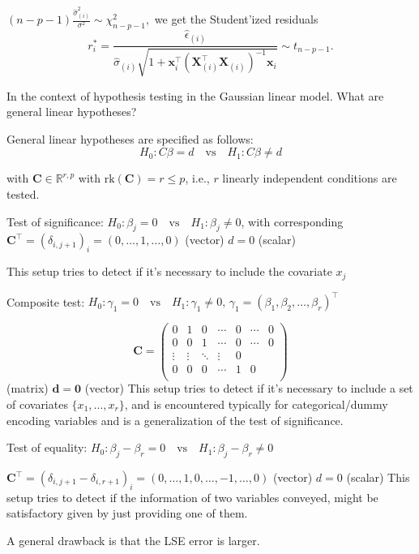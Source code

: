 \(
\left( n - p - 1 \right) \frac{\hat{\sigma}^2_{(i)}}{\sigma^2} \sim \chi^2_{n - p - 1},
\)
we get the Student'ized residuals
\[
r_i^* = \frac{\hat{\epsilon}_{(i)}}{\hat{\sigma}_{(i)} \sqrt{1 + \mathbf{x}_i^\top \left( \mathbf{X}_{(i)}^\top \mathbf{X}_{(i)} \right)^{-1} \mathbf{x}_i}} \sim t_{n - p - 1}.
\]


In the context of hypothesis testing in the Gaussian linear model. 
What are general linear hypotheses? 

General linear hypotheses are specified as follows:
\[ H_0: C\beta = d \quad \text{vs} \quad H_1: C\beta \neq d \]

with \( \mathbf{C} \in \mathbb{R}^{r, p} \) with \( \text{rk}(\mathbf{C}) = r \leq p \), i.e., \( r \) linearly independent conditions are tested.

Test of significance: 
\( H_0: \beta_j = 0 \quad \text{vs} \quad H_1: \beta_j \neq 0 \),
with corresponding
\( \mathbf{C}^\top = (\delta_{i, j+1})_i = (0, \dots, 1, \dots, 0) \) (vector)
\( d = 0 \) (scalar)

This setup tries to detect if it's necessary to include the covariate \(x_j\)

Composite test:
\( H_0: \gamma_1 = 0 \quad \text{vs} \quad H_1: \gamma_1 \neq 0, \, \gamma_1 = (\beta_1, \beta_2, \ldots, \beta_r)^\top \)


\[ \mathbf{C} = \begin{pmatrix}
0 & 1 & 0 & \cdots & 0 & \cdots & 0 \\
0 & 0 & 1 & \cdots & 0 & \cdots & 0 \\
\vdots & \vdots & \ddots & \vdots & 0 \\
0 & 0 & 0 & \cdots & 1 & 0 \\
\end{pmatrix} \] (matrix)
\( \mathbf{d} = \mathbf{0} \) (vector)
This setup tries to detect if it's necessary to include a set of covariates \( \{x_1, \dots, x_r \} \),
and is encountered typically for categorical/dummy encoding variables and is a generalization of the test of significance.

Test of equality:
\( H_0: \beta_j - \beta_r = 0 \quad \text{vs} \quad H_1: \beta_j - \beta_r \neq 0 \)

\( \mathbf{C}^\top = (\delta_{i, j+1} - \delta_{i, r+1})_i = (0, \dots, 1, 0, \dots, -1, \dots, 0) \) (vector)
\( d = 0 \) (scalar)
This setup tries to detect if the information of two variables conveyed, might be satisfactory given by just providing one of them.


A general drawback is that the LSE error is larger.



